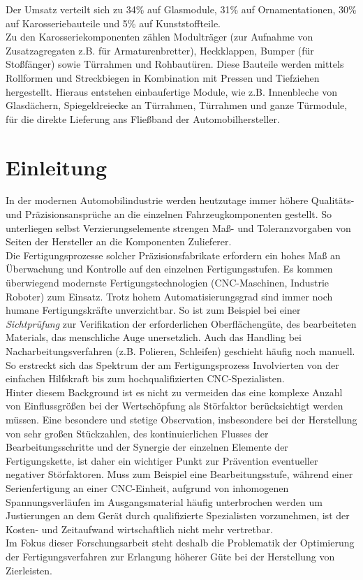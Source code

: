 \documentclass[12pt,a4paper,parskip,twoside,BCOR5mm,headsepline]{scrartcl}
\begin{document}
Der Umsatz verteilt sich zu 34\% auf Glasmodule, 31\% auf Ornamentationen, 30\% auf Karosseriebauteile und 5\% auf Kunststoffteile.\\
Zu den Karosseriekomponenten zählen Modulträger (zur Aufnahme von Zusatzagregaten z.B. für Armaturenbretter), Heckklappen, Bumper (für Stoßfänger) sowie Türrahmen und Rohbautüren.
Diese Bauteile werden mittels Rollformen und Streckbiegen in Kombination mit Pressen und Tiefziehen hergestellt. Hieraus entstehen einbaufertige Module, wie z.B. Innenbleche von Glasdächern, Spiegeldreiecke an Türrahmen, Türrahmen und ganze Türmodule, für die direkte Lieferung ans Fließband der Automobilhersteller.



\section{Einleitung}
In der modernen Automobilindustrie werden heutzutage immer höhere Qualitäts- und Präzisionsansprüche an die einzelnen Fahrzeugkomponenten  gestellt. So unterliegen selbst Verzierungselemente strengen Maß- und Toleranzvorgaben von Seiten der Hersteller an die Komponenten Zulieferer.\\
 Die Fertigungsprozesse solcher Präzisionsfabrikate erfordern ein hohes Maß an Überwachung und Kontrolle auf den einzelnen Fertigungsstufen. Es kommen überwiegend modernste Fertigungstechnologien (CNC-Maschinen, Industrie Roboter) zum Einsatz. Trotz hohem Automatisierungsgrad sind immer noch humane Fertigungskräfte unverzichtbar. So ist zum Beispiel bei einer \emph{Sichtprüfung} zur Verifikation der erforderlichen Oberflächengüte, des bearbeiteten Materials,  das menschliche Auge unersetzlich. Auch das Handling bei Nacharbeitungsverfahren (z.B. Polieren, Schleifen) geschieht häufig noch manuell. So  erstreckt sich das Spektrum der am Fertigungsprozess Involvierten von der einfachen Hilfskraft bis zum hochqualifizierten CNC-Spezialisten.\\
  Hinter diesem Background ist es nicht zu vermeiden das eine komplexe Anzahl von Einflussgrößen bei der Wertschöpfung als Störfaktor berücksichtigt werden müssen. Eine besondere und stetige Observation, insbesondere bei der Herstellung von sehr großen Stückzahlen,  des kontinuierlichen Flusses der Bearbeitungsschritte und der Synergie der einzelnen Elemente  der Fertigungskette, ist daher ein wichtiger Punkt zur Prävention eventueller negativer Störfaktoren. Muss zum Beispiel eine Bearbeitungsstufe, während einer Serienfertigung an einer CNC-Einheit,  aufgrund von inhomogenen Spannungsverläufen im Ausgangsmaterial häufig unterbrochen werden um Justierungen an dem Gerät durch   qualifizierte Spezialisten vorzunehmen,  ist der Kosten- und Zeitaufwand wirtschaftlich nicht mehr vertretbar.\\
     Im Fokus dieser Forschungsarbeit steht deshalb die Problematik der Optimierung der Fertigungsverfahren zur Erlangung höherer Güte bei der Herstellung von Zierleisten.
 
\end{document}
